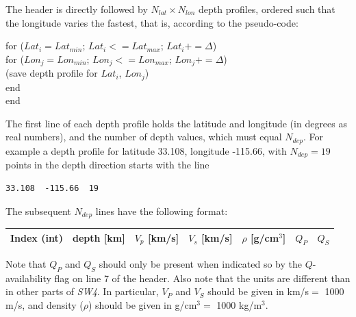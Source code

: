 \documentclass[11pt]{report}
\begin{document}
The header is directly followed by $N_{lat}\times N_{lon}$ depth profiles, ordered such that the longitude
varies the fastest, that is, according to the pseudo-code:
\begin{flushleft}
\hspace{10mm}  for ($Lat_i= Lat_{min}$; $Lat_i <= Lat_{max}$; $Lat_i += \Delta$)\\
\hspace{20mm}    for ($Lon_j= Lon_{min}$; $Lon_j <= Lon_{max}$; $Lon_j += \Delta$)\\
\hspace{30mm}      (save depth profile for $Lat_i$, $Lon_j$)\\
\hspace{20mm}    end\\
\hspace{10mm}  end
\end{flushleft}

The first line of each depth profile holds the latitude and longitude (in degrees as real
numbers), and the number of depth values, which must equal $N_{dep}$. For example a depth profile
for latitude 33.108, longitude -115.66, with $N_{dep}=19$ points in the depth direction starts with the line
\begin{verbatim}
33.108  -115.66  19
\end{verbatim}
The subsequent $N_{dep}$ lines have the following format:
\begin{center}
\begin{tabular}{lllllll}\hline
Index (int)& depth [km] & $V_p$ [km/s] &  $V_s$ [km/s] & $\rho$ [g/cm$^3$] & $Q_P$ & $Q_S$ \\ \hline
\end{tabular}
\end{center}
Note that $Q_P$ and $Q_S$ should only be present when indicated so by the $Q$-availability flag on
line 7 of the header. Also note that the units are different than in other parts of \emph{SW4}. In
particular, $V_P$ and $V_S$ should be given in km/s$=$ 1000 m/s, and density ($\rho$) should be
given in g/cm$^3=$ 1000 kg/m$^3$.
\end{document}
